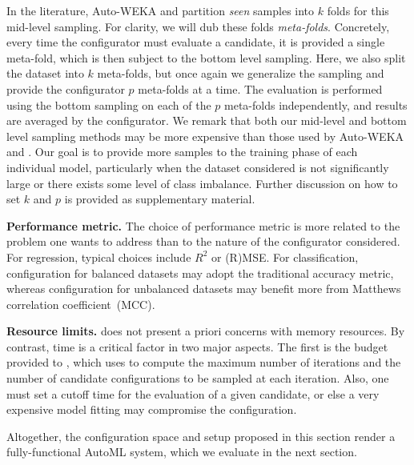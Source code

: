 In the literature, Auto-WEKA and \autosklearn partition \emph{seen} samples into $k$ folds for this mid-level sampling. For clarity, we will dub these folds \emph{meta-folds}. Concretely, every time the configurator must evaluate a candidate, it is provided a single meta-fold, which is then subject to the bottom level sampling. Here, we also split the dataset into $k$ meta-folds, but once again we generalize the sampling and provide the configurator $p$ meta-folds at a time. The evaluation is performed using the bottom sampling on each of the $p$ meta-folds independently, and results are averaged by the configurator. We remark that both our mid-level and bottom level sampling methods may be more expensive than those used by Auto-WEKA and \autosklearn. Our goal is to provide more samples to the training phase of each individual model, particularly when the dataset considered is not significantly large or there exists some level of class imbalance. Further discussion on how to set $k$ and $p$ is provided as supplementary material.

\textbf{Performance metric.} The choice of performance metric is more related to the problem one wants to address than to the nature of the configurator considered. For regression, typical choices include $R^2$ or (R)MSE. For classification, configuration for balanced datasets may adopt the traditional accuracy metric, whereas configuration for unbalanced datasets may benefit more from Matthews correlation coefficient~(MCC).

\textbf{Resource limits.} \isklearn does not present a priori concerns with memory resources. By contrast, time is a critical factor in two major aspects. The first is the budget provided to \isklearn, which \irace uses to compute the maximum number of iterations and the number of candidate configurations to be sampled at each iteration. Also, one must set a cutoff time for the evaluation of a given candidate, or else a very expensive model fitting may compromise the configuration.

%

\medskip

Altogether, the configuration space and setup proposed in this section render \isklearn a fully-functional AutoML system, which we evaluate in the next section.